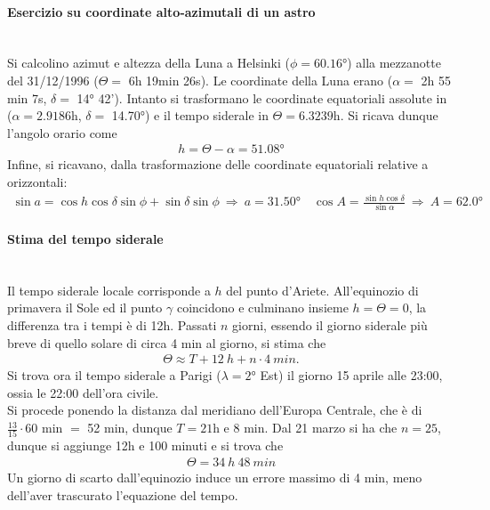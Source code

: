 \documentclass[a4paper, oneside]{book}
\begin{document}
\paragraph{Esercizio su coordinate alto-azimutali di un astro} \mbox{} \\
Si calcolino azimut e altezza della Luna a Helsinki ($\phi = 60.16$°)
alla mezzanotte del 31/12/1996 ($\Theta =$ 6h 19min 26s). Le coordinate 
della Luna erano ($\alpha =$ 2h 55 min 7s, $\delta =$ 14° 42').
Intanto si trasformano le coordinate equatoriali assolute in ($\alpha  =2.9186$h, $\delta =$ 14.70°) 
e il tempo siderale in $\Theta = 6.3239$h. Si ricava dunque 
l'angolo orario come 
\begin{gather*}
    h = \Theta - \alpha = 51.08\text{°}
\end{gather*}
Infine, si ricavano, dalla trasformazione delle coordinate 
equatoriali relative a orizzontali:
\begin{gather*}
    \sin a = \cos h \cos \delta \sin \phi + \sin \delta \sin \phi \ \Longrightarrow \ a = 31.50\text{°} \quad 
    \cos A = \frac{\sin h\cos\delta}{\sin \alpha} \ \Longrightarrow \ A = 62.0\text{°}
\end{gather*}

\paragraph{Stima del tempo siderale} \mbox{} \\
Il tempo siderale locale corrisponde a $h$ del punto d'Ariete. All'equinozio di primavera 
il Sole ed il punto $\gamma$ coincidono e culminano insieme $h = \Theta = 0$, la differenza 
tra i tempi è di 12h. Passati $n$ giorni, essendo il giorno siderale più breve 
di quello solare di circa 4 min al giorno, si stima che
\begin{align}
    \Theta \approx T + 12 \ h + n \cdot 4 \ min.
\end{align}
Si trova ora il tempo siderale a Parigi ($\lambda = 2$° Est) il giorno
15 aprile alle 23:00, ossia le 22:00 dell'ora civile. \\
Si procede ponendo la distanza dal meridiano dell'Europa Centrale, che è di 
$\frac{13}{15} \cdot 60 $ min $=$ 52 min, dunque $T = 21$h e 8 min. Dal 21 marzo 
si ha che $n = 25$, dunque si aggiunge 12h e 100 minuti e si trova che
\begin{gather*}
    \Theta = 34 \ h \ 48 \ min 
\end{gather*}
Un giorno di scarto dall'equinozio induce un errore massimo di 4 min, meno 
dell'aver trascurato l'equazione del tempo.
\end{document}
